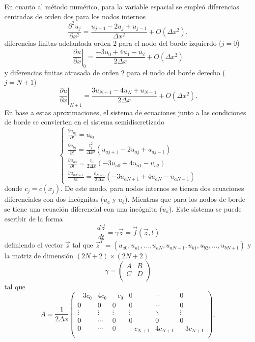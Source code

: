 \documentclass[aps,prb,twocolumn,superscriptaddress,floatfix,longbibliography,10pt]{revtex4-2}
\newcounter{para}
\begin{document}
En cuanto al método numérico, para la variable espacial se empleó diferencias centradas de orden dos para los nodos internos \cite{Moin}
\[\frac{\partial^2 u_j}{\partial x^2} = \frac{u_{j+1} - 2 u_j + u_{j-1}}{\Delta x^2} + O(\Delta x^2),  \]
diferencias finitas adelantada orden 2 para el nodo del borde izquierdo ($j = 0$) \cite{Moin}
\[\left . \frac{\partial u}{\partial x} \right |_0 = \frac{-3 u_0 + 4 u_{1} - u_{2}}{2 \Delta x} + O(\Delta x^2) \]
y diferencias finitas atrasada de orden 2 para el nodo del borde derecho ($j = N + 1$) \cite{diferencias_finitas_adelantadas}
\[\left . \frac{\partial u}{\partial x} \right |_{N+1} = \frac{3 u_{N+1} - 4 u_N + u_{N-1}}{2 \Delta x} + O(\Delta x^2). \]
En base a estas aproximaciones, el sistema de ecuaciones junto a las condiciones de borde se convierten en el sistema semidiscretizado
\begin{equation}
  \left \{ \begin{matrix}
   \frac{\partial u_{a j}}{\partial t} = u_{b j} \\
   \frac{\partial u_{b j}}{\partial t} = \frac{c_j^2}{\Delta x^2} (u_{a j+1} - 2 u_{a j} + u_{a j-1}) \\
   \frac{\partial u_{a 0}}{\partial t} = \frac{c_0}{2 \Delta x} (-3 u_{a 0} + 4 u_{a 1} - u_{a 2}) \\
   \frac{\partial u_{a N+1}}{\partial t} = \frac{c_{N+1}}{2 \Delta x} (-3u_{a N+1} + 4 u_{a N} - u_{a N-1}) 
  \end{matrix} \right .
  \label{eq:sistema_semi_discretizado}
\end{equation}
donde $c_j = c(x_j)$. De este modo, para nodos internos se tienen dos ecuaciones diferenciales con dos incógnitas ($u_a$ y $u_b$). Mientras que para los nodos de borde se tiene una ecuación diferencial con una incógnita ($u_a$). Este sistema se puede escribir de la forma
\[\frac{d \vec{z}}{dt} = \gamma \vec{z} = \vec{f}(\vec{z},t)\]
definiendo el vector $\vec{z}$ tal que $\vec{z}^T = (u_{a 0}, u_{a 1}, \dots, u_{a N}, u_{a N+1}, u_{b 1}, u_{b 2}, \dots, u_{b N+1})$ y la matriz de dimensión $(2N+2) \times (2N+2)$
\[\gamma = \begin{pmatrix}
  A & B \\
  C & D \\
  \end{pmatrix}\]
tal que
\[A = \frac{1}{2 \Delta x} \begin{pmatrix}
  -3c_0 & 4c_0 & -c_0 & 0 & \cdots & 0 \\
  0 & 0 & 0 & 0 & \cdots & 0 \\
  \vdots & \vdots & \vdots & \vdots & \ddots & \vdots \\
  0 & \cdots & 0 & 0 & 0 & 0 \\
  0 & \cdots & 0 & -c_{N+1} & 4c_{N+1} & -3c_{N+1} \\
  \end{pmatrix}, \]
\end{document}
